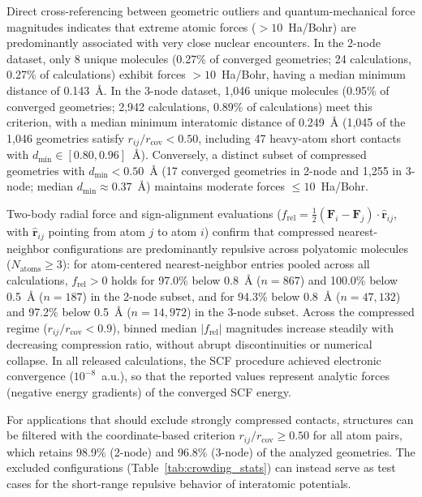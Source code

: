 \documentclass[fleqn,10pt]{article}
\begin{document}
Direct cross-referencing between geometric outliers and quantum-mechanical force magnitudes indicates that extreme atomic forces ($>10$~Ha/Bohr) are predominantly associated with very close nuclear encounters. In the 2-node dataset, only 8 unique molecules (0.27\% of converged geometries; 24 calculations, 0.27\% of calculations) exhibit forces $>10$~Ha/Bohr, having a median minimum distance of 0.143~\AA{}. In the 3-node dataset, 1,046 unique molecules (0.95\% of converged geometries; 2,942 calculations, 0.89\% of calculations) meet this criterion, with a median minimum interatomic distance of 0.249~\AA{} (1,045 of the 1,046 geometries satisfy $r_{ij}/r_{\mathrm{cov}} < 0.50$, including 47 heavy-atom short contacts with $d_{\min} \in [0.80, 0.96]$~\AA{}). Conversely, a distinct subset of compressed geometries with $d_{\min} < 0.50$~\AA{} (17 converged geometries in 2-node and 1,255 in 3-node; median $d_{\min} \approx 0.37$~\AA{}) maintains moderate forces $\le 10$~Ha/Bohr.

Two-body radial force and sign-alignment evaluations ($f_{\mathrm{rel}} = \frac{1}{2}(\mathbf{F}_i - \mathbf{F}_j)\cdot\hat{\mathbf{r}}_{ij}$, with $\hat{\mathbf{r}}_{ij}$ pointing from atom $j$ to atom $i$) confirm that compressed nearest-neighbor configurations are predominantly repulsive across polyatomic molecules ($N_{\mathrm{atoms}} \ge 3$): for atom-centered nearest-neighbor entries pooled across all calculations, $f_{\mathrm{rel}} > 0$ holds for 97.0\% below 0.8~\AA{} ($n = 867$) and 100.0\% below 0.5~\AA{} ($n = 187$) in the 2-node subset, and for 94.3\% below 0.8~\AA{} ($n = 47{,}132$) and 97.2\% below 0.5~\AA{} ($n = 14{,}972$) in the 3-node subset. Across the compressed regime ($r_{ij}/r_{\mathrm{cov}} < 0.9$), binned median $|f_{\mathrm{rel}}|$ magnitudes increase steadily with decreasing compression ratio, without abrupt discontinuities or numerical collapse. In all released calculations, the SCF procedure achieved electronic convergence ($10^{-8}$~a.u.), so that the reported values represent analytic forces (negative energy gradients) of the converged SCF energy.

For applications that should exclude strongly compressed contacts, structures can be filtered with the coordinate-based criterion $r_{ij} / r_{\text{cov}} \ge 0.50$ for all atom pairs, which retains 98.9\% (2-node) and 96.8\% (3-node) of the analyzed geometries. The excluded configurations (Table~\ref{tab:crowding_stats}) can instead serve as test cases for the short-range repulsive behavior of interatomic potentials.
\end{document}
